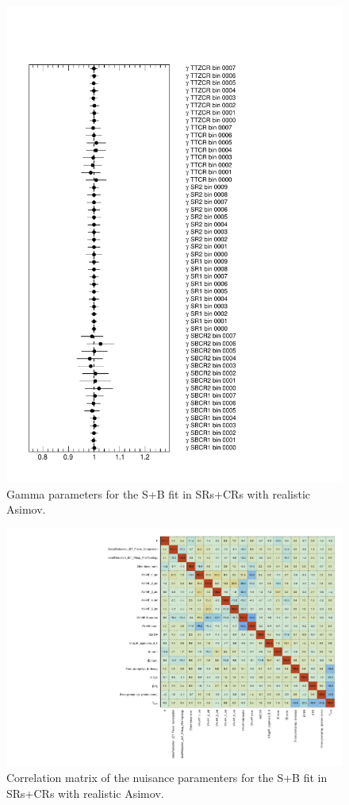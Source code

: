 \begin{figure}[htbp]
	\centering
	\includegraphics[width=.85\textwidth]{Appendices/AP9/figures/SPLUSB_CRSR_UsingBaseFullSys/Gammas}
	\caption{Gamma parameters for the S+B \tZc fit in SRs+CRs with realistic Asimov.}%
	\label{fig:stat:tzc:splusb:crsr:gamma_base}
\end{figure}

\begin{figure}[htbp]
	\centering
	\includegraphics[width=.95\textwidth]{Appendices/AP9/figures/SPLUSB_CRSR_UsingBaseFullSys/CorrMatrix}
	\caption{Correlation matrix of the nuisance paramenters for the S+B \tZc fit in SRs+CRs with realistic Asimov.}%
	\label{fig:stat:tzc:splusb:crsr:corrmatrix_base}
\end{figure}

